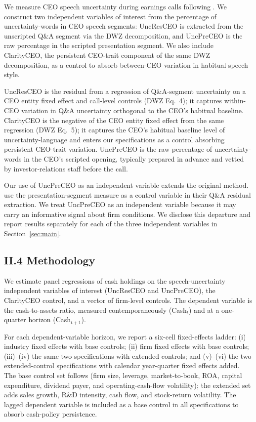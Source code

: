 We measure CEO speech uncertainty during earnings calls following . We construct two independent variables of interest from the percentage of uncertainty-words in CEO speech segments: UncResCEO is extracted from the unscripted Q\&A segment via the DWZ decomposition, and UncPreCEO is the raw percentage in the scripted presentation segment. We also include ClarityCEO, the persistent CEO-trait component of the same DWZ decomposition, as a control to absorb between-CEO variation in habitual speech style.

UncResCEO is the residual from a regression of Q\&A-segment uncertainty on a CEO entity fixed effect and call-level controls (DWZ Eq.~4); it captures within-CEO variation in Q\&A uncertainty orthogonal to the CEO's habitual baseline. ClarityCEO is the negative of the CEO entity fixed effect from the same regression (DWZ Eq.~5); it captures the CEO's habitual baseline level of uncertainty-language and enters our specifications as a control absorbing persistent CEO-trait variation. UncPreCEO is the raw percentage of uncertainty-words in the CEO's scripted opening, typically prepared in advance and vetted by investor-relations staff before the call.

Our use of UncPreCEO as an independent variable extends the original method.  use the presentation-segment measure as a control variable in their Q\&A residual extraction. We treat UncPreCEO as an independent variable because it may carry an informative signal about firm conditions. We disclose this departure and report results separately for each of the three independent variables in Section~\ref{sec:main}.

\subsection*{II.4 Methodology}
\label{sec:framework:methodology}

We estimate panel regressions of cash holdings on the speech-uncertainty independent variables of interest (UncResCEO and UncPreCEO), the ClarityCEO control, and a vector of firm-level controls. The dependent variable is the cash-to-assets ratio, measured contemporaneously (Cash$_{t}$) and at a one-quarter horizon (Cash$_{t+1}$).

For each dependent-variable horizon, we report a six-cell fixed-effects ladder: (i) industry fixed effects with base controls; (ii) firm fixed effects with base controls; (iii)--(iv) the same two specifications with extended controls; and (v)--(vi) the two extended-control specifications with calendar year-quarter fixed effects added. The base control set follows  (firm size, leverage, market-to-book, ROA, capital expenditure, dividend payer, and operating-cash-flow volatility); the extended set adds sales growth, R\&D intensity, cash flow, and stock-return volatility. The lagged dependent variable is included as a base control in all specifications to absorb cash-policy persistence.

